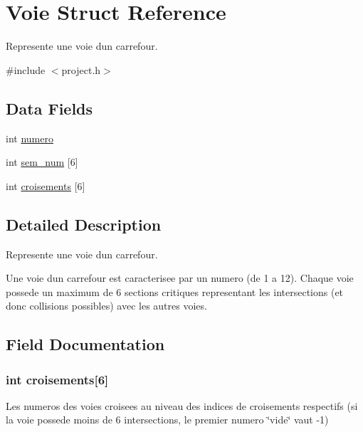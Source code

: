\hypertarget{struct_voie}{}\section{Voie Struct Reference}
\label{struct_voie}


Represente une voie d\textquotesingle{}un carrefour.  




{\ttfamily \#include $<$project.\+h$>$}

\subsection*{Data Fields}
\begin{DoxyCompactItemize}
\item 
int \hyperlink{struct_voie_a2c30f43104974e72e2809fb4569804b0}{numero}
\item 
int \hyperlink{struct_voie_ac9436ae55f35dfc5e3dc8e676c73aeb5}{sem\+\_\+num} \mbox{[}6\mbox{]}
\item 
int \hyperlink{struct_voie_ae6c4a614ad59b4d83fc3001ff282a26b}{croisements} \mbox{[}6\mbox{]}
\end{DoxyCompactItemize}


\subsection{Detailed Description}
Represente une voie d\textquotesingle{}un carrefour. 

Une voie d\textquotesingle{}un carrefour est caracterisee par un numero (de 1 a 12). Chaque voie possede un maximum de 6 sections critiques representant les intersections (et donc collisions possibles) avec les autres voies. 

\subsection{Field Documentation}
\hypertarget{struct_voie_ae6c4a614ad59b4d83fc3001ff282a26b}{}
\subsubsection[{croisements}]{\setlength{\rightskip}{0pt plus 5cm}int croisements\mbox{[}6\mbox{]}}\label{struct_voie_ae6c4a614ad59b4d83fc3001ff282a26b}
Les numeros des voies croisees au niveau des indices de croisements respectifs (si la voie possede moins de 6 intersections, le premier numero \char`\"{}vide\char`\"{} vaut -\/1) \hypertarget{struct_voie_a2c30f43104974e72e2809fb4569804b0}{}
